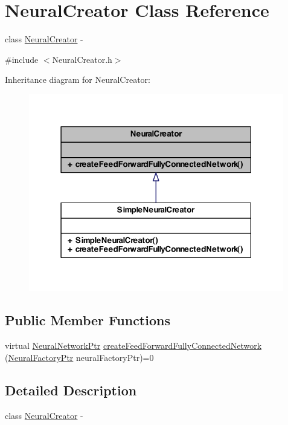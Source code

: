 \hypertarget{class_neural_creator}{
\section{NeuralCreator Class Reference}
\label{class_neural_creator}
}


class \hyperlink{class_neural_creator}{NeuralCreator} -\/  




{\ttfamily \#include $<$NeuralCreator.h$>$}



Inheritance diagram for NeuralCreator:
\nopagebreak
\begin{figure}[H]
\begin{center}
\leavevmode
\includegraphics[width=316pt]{class_neural_creator__inherit__graph}
\end{center}
\end{figure}
\subsection*{Public Member Functions}
\begin{DoxyCompactItemize}
\item 
virtual \hyperlink{_a_m_o_r_e_8h_a7adadf1c313313507b00cd1193db29a1}{NeuralNetworkPtr} \hyperlink{class_neural_creator_adc9b52a5271eed92d0f318b5da100515}{createFeedForwardFullyConnectedNetwork} (\hyperlink{_a_m_o_r_e_8h_ac4ad88962955479bfc426da9ce4571d2}{NeuralFactoryPtr} neuralFactoryPtr)=0
\end{DoxyCompactItemize}


\subsection{Detailed Description}
class \hyperlink{class_neural_creator}{NeuralCreator} -\/ 

